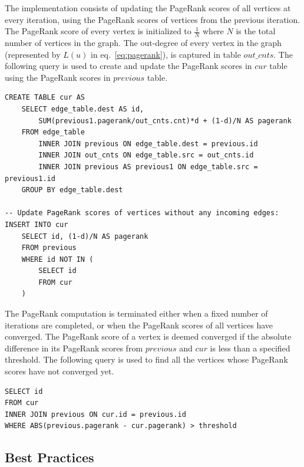 The implementation consists of updating the PageRank scores of all vertices
at every iteration, using the PageRank scores of vertices from the previous
iteration. The PageRank score of every vertex is initialized to $\frac{1}{N}$
where $N$ is the total number of vertices in the graph. The out-degree of
every vertex in the graph (represented by $L(u)$ in eq.~\ref{eq:pagerank}),
is captured in table $out\_cnts$. The following query is used to create and
update the PageRank scores in $cur$ table using the PageRank scores in
$previous$ table.

\begin{algorithm}
\label{alg:pagerank:update}
\begin{lstlisting}
CREATE TABLE cur AS
    SELECT edge_table.dest AS id,
        SUM(previous1.pagerank/out_cnts.cnt)*d + (1-d)/N AS pagerank
    FROM edge_table
        INNER JOIN previous ON edge_table.dest = previous.id
        INNER JOIN out_cnts ON edge_table.src = out_cnts.id
        INNER JOIN previous AS previous1 ON edge_table.src = previous1.id
    GROUP BY edge_table.dest

-- Update PageRank scores of vertices without any incoming edges:
INSERT INTO cur
    SELECT id, (1-d)/N AS pagerank
    FROM previous
    WHERE id NOT IN (
        SELECT id
        FROM cur
    )
\end{lstlisting}
\end{algorithm}

The PageRank computation is terminated either when a fixed number of iterations
are completed, or when the PageRank scores of all vertices have converged. The
PageRank score of a vertex is deemed converged if the absolute difference in
its PageRank scores from $previous$ and $cur$ is less than a specified threshold.
The following query is used to find all the vertices whose PageRank scores have
not converged yet.

\begin{algorithm}
\label{alg:pagerank:update}
\begin{lstlisting}
SELECT id
FROM cur
INNER JOIN previous ON cur.id = previous.id
WHERE ABS(previous.pagerank - cur.pagerank) > threshold
\end{lstlisting}
\end{algorithm}

\subsection{Best Practices} \label{sec:pagerank:bestpractices}

